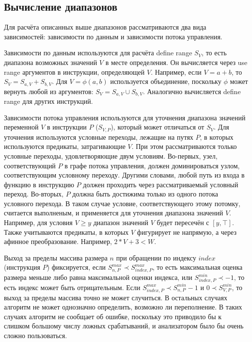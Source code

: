 \subsection{Вычисление диапазонов}

Для расчёта описанных выше диапазонов рассматриваются два вида
зависимостей: зависимости по данным и зависимости потока управления.

Зависимости по данным используются для расчёта define range $S_V$, то
есть диапазона возможных значений $V$ в месте определения. Он
вычисляется через use range аргументов в инструкции, определяющей
$V$. Например, если $V = a + b$, то $S_V = S_{a, V} + S_{b, V}$. Для
$V = \phi(a, b)$ используется объединение, поскольку $\phi$ может
вернуть любой из аргументов: $S_V = S_{a, V} \cup S_{b, V}$. Аналогично
вычисляется define range для других инструкций.

Зависимости потока управления используются для уточнения диапазона
значений переменной $V$ в инструкции $P$ ($S_{V, P}$), который может
отличаться от $S_V$. Для уточнения используются условные переходы,
лежащие на путях $P$, в которых используются предикаты, затрагивающие
$V$. При этом рассматриваются только условные переходы,
удовлетворяющие двум условиям. Во-первых, узел, соответствующий $P$ в
графе потока управления, должен доминироваться узлом, соответствующим
условному переходу. Другими словами, любой путь из входа в функцию в
инструкцию $P$ должен проходить через рассматриваемый условный
переход. Во-вторых, $P$ должна быть достижима только из одного потока
условного перехода. В таком случае условие, соответствующего этому
потомку, считается выполненым, и применяется для уточнения диапазона
значений $V$. Например, для условия $V \geq y$ диапазон значений $V$
будет пересечён с $[y, \top]$. Также учитываются предикаты, в которых
$V$ фигурирует не напрямую, а через афинное преобразование. Например,
$2 * V + 3 < W$.

Выход за пределы массива размера $n$ при обращении по индексу $index$
(инструкция $P$) фиксируется, если
$S_{n, P}^{max} \prec S_{index, P}^{max}$, то есть максимальная оценка
размера меньше либо равна максимальной оценки индекса, или $S_{index, P}^{min} \prec
-1$, то есть индекс может быть отрицательным. Если $S_{index, P}^{max}
\prec S_{n, P}^{min} - 1$ и $0 \prec S_{V, P}^{min}$, то выход за
пределы массива точно не может случиться. В остальных случаях алгоритм
не может однозначно определить, возможно ли переполнение. В таких
случаях алгоритм не сообщает об ошибке, поскольку это приводило бы к
слишком большому числу ложных срабатываний, и анализатором было бы
очень сложно пользоваться.

